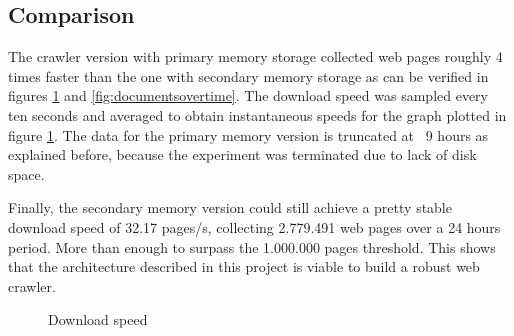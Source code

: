 \documentclass{report}
\begin{document}
\subsection{Comparison}

The crawler version with primary memory storage collected web pages roughly 4 times faster
than the one with secondary memory storage as can be verified in figures \ref{fig:downloadspeed}
and \ref{fig:documentsovertime}. The download speed was sampled every ten seconds and averaged to
obtain instantaneous speeds for the graph plotted in figure \ref{fig:downloadspeed}. The data for the primary memory 
version is truncated at ~9 hours as explained before, because the experiment was terminated due to lack of disk space. 

Finally, the secondary memory version could still achieve a pretty stable download speed of 32.17 pages/s, collecting 
2.779.491 web pages over a 24 hours period. More than enough to surpass the 1.000.000 pages threshold. This shows
that the architecture described in this project is viable to build a robust web crawler.

\begin{figure}
\centering
{}
\caption{Download speed}
\label{fig:downloadspeed}
\end{figure}
\end{document}
